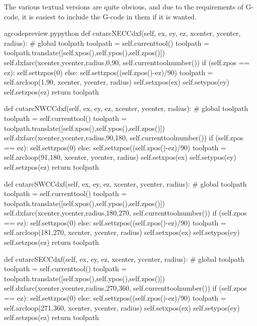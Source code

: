 \documentclass{ltxdoc}
\begin{document}
The various textual versions are quite obvious, and due to the requirements of G-code, it is easiest to include the G-code in them if it is wanted.

    

\lstset{firstnumber=\thegcpy}
\begin{writecode}{a}{gcodepreview.py}{python}
    def cutarcNECCdxf(self, ex, ey, ez, xcenter, ycenter, radius):
#        global toolpath
        toolpath = self.currenttool()
        toolpath = toolpath.translate([self.xpos(),self.ypos(),self.zpos()])
        self.dxfarc(xcenter,ycenter,radius,0,90, self.currenttoolnumber())
        if (self.zpos == ez):
            self.settzpos(0)
        else:         
            self.settzpos((self.zpos()-ez)/90)
        toolpath = self.arcloop(1,90, xcenter, ycenter, radius)
        self.setxpos(ex)
        self.setypos(ey)
        self.setzpos(ez)
        return toolpath

    def cutarcNWCCdxf(self, ex, ey, ez, xcenter, ycenter, radius):
#        global toolpath
        toolpath = self.currenttool()
        toolpath = toolpath.translate([self.xpos(),self.ypos(),self.zpos()])
        self.dxfarc(xcenter,ycenter,radius,90,180, self.currenttoolnumber())
        if (self.zpos == ez):
            self.settzpos(0)
        else:         
            self.settzpos((self.zpos()-ez)/90)
        toolpath = self.arcloop(91,180, xcenter, ycenter, radius)
        self.setxpos(ex)
        self.setypos(ey)
        self.setzpos(ez)
        return toolpath

    def cutarcSWCCdxf(self, ex, ey, ez, xcenter, ycenter, radius):
#        global toolpath
        toolpath = self.currenttool()
        toolpath = toolpath.translate([self.xpos(),self.ypos(),self.zpos()])
        self.dxfarc(xcenter,ycenter,radius,180,270, self.currenttoolnumber())
        if (self.zpos == ez):
            self.settzpos(0)
        else:         
            self.settzpos((self.zpos()-ez)/90)
        toolpath = self.arcloop(181,270, xcenter, ycenter, radius)
        self.setxpos(ex)
        self.setypos(ey)
        self.setzpos(ez)
        return toolpath

    def cutarcSECCdxf(self, ex, ey, ez, xcenter, ycenter, radius):
#        global toolpath
        toolpath = self.currenttool()
        toolpath = toolpath.translate([self.xpos(),self.ypos(),self.zpos()])
        self.dxfarc(xcenter,ycenter,radius,270,360, self.currenttoolnumber())
        if (self.zpos == ez):
            self.settzpos(0)
        else:         
            self.settzpos((self.zpos()-ez)/90)
        toolpath = self.arcloop(271,360, xcenter, ycenter, radius)
        self.setxpos(ex)
        self.setypos(ey)
        self.setzpos(ez)
        return toolpath


\end{writecode}
\end{document}
